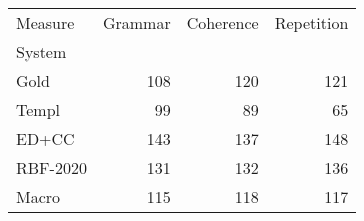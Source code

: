 \begin{tabular}{lrrr}
\toprule
Measure & Grammar & Coherence & Repetition \\
System &  &  &  \\
\midrule
Gold & 108 & 120 & 121 \\
Templ & 99 & 89 & 65 \\
ED+CC & 143 & 137 & 148 \\
RBF-2020 & 131 & 132 & 136 \\
Macro & 115 & 118 & 117 \\
\bottomrule
\end{tabular}
